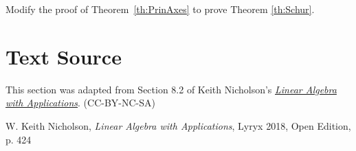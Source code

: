 \documentclass{ximera}
\begin{document}
\begin{problem}\label{prob:SchurChallenge}
Modify the proof of Theorem~\ref{th:PrinAxes} to prove Theorem \ref{th:Schur}.
\end{problem}

\section*{Text Source} This section was adapted from Section 8.2 of Keith Nicholson's \href{https://open.umn.edu/opentextbooks/textbooks/linear-algebra-with-applications}{\it Linear Algebra with Applications}. (CC-BY-NC-SA)

W. Keith Nicholson, {\it Linear Algebra with Applications}, Lyryx 2018, Open Edition, p. 424
\end{document}

